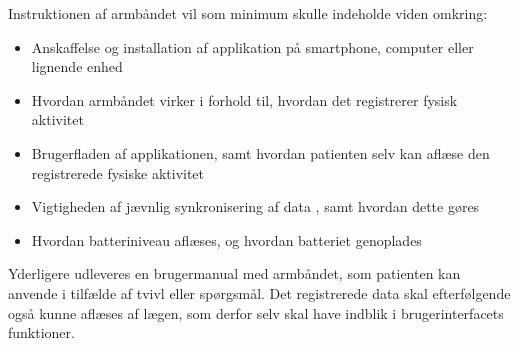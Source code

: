 \noindent
Instruktionen af armbåndet vil som minimum skulle indeholde viden omkring: 
\begin{itemize}
\item Anskaffelse og installation af applikation på smartphone, computer eller lignende enhed
\item Hvordan armbåndet virker i forhold til, hvordan det registrerer fysisk aktivitet 
\item Brugerfladen af applikationen, samt hvordan patienten selv kan aflæse den registrerede fysiske aktivitet
\item Vigtigheden af jævnlig synkronisering af data , samt hvordan dette gøres
\item Hvordan batteriniveau aflæses, og hvordan batteriet genoplades \\
\end{itemize}


\noindent
Yderligere udleveres en brugermanual med armbåndet, som patienten kan anvende i tilfælde af tvivl eller spørgsmål. Det registrerede data skal efterfølgende også kunne aflæses af lægen, som derfor selv skal have indblik i brugerinterfacets funktioner.

